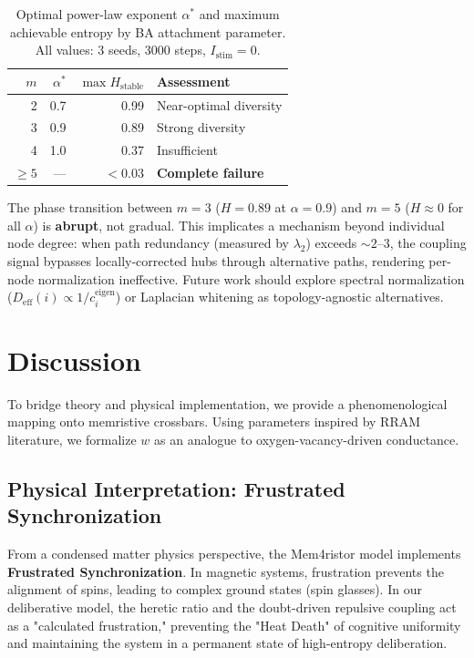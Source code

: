 \documentclass[11pt]{article}
\begin{document}
\begin{table}[h]
\centering
\caption{Optimal power-law exponent $\alpha^*$ and maximum achievable entropy by BA attachment parameter. All values: 3 seeds, 3000 steps, $I_{\text{stim}} = 0$.}
\label{tab:alpha_sweep}
\begin{tabular}{rrrl}
\toprule
$m$ & $\alpha^*$ & $\max H_{\text{stable}}$ & Assessment \\
\midrule
2  & 0.7 & 0.99 & Near-optimal diversity \\
3  & 0.9 & 0.89 & Strong diversity \\
4  & 1.0 & 0.37 & Insufficient \\
$\geq 5$ & --- & $<0.03$ & \textbf{Complete failure} \\
\bottomrule
\end{tabular}
\end{table}

The phase transition between $m=3$ ($H = 0.89$ at $\alpha = 0.9$) and $m = 5$ ($H \approx 0$ for all $\alpha$) is \textbf{abrupt}, not gradual. This implicates a mechanism beyond individual node degree: when path redundancy (measured by $\lambda_2$) exceeds $\sim 2$--$3$, the coupling signal bypasses locally-corrected hubs through alternative paths, rendering per-node normalization ineffective. Future work should explore spectral normalization ($D_{\text{eff}}(i) \propto 1/c_i^{\text{eigen}}$) or Laplacian whitening as topology-agnostic alternatives.

\section{Discussion}

To bridge theory and physical implementation, we provide a phenomenological mapping onto memristive crossbars. Using parameters inspired by RRAM literature, we formalize $w$ as an analogue to oxygen-vacancy-driven conductance. 

\subsection{Physical Interpretation: Frustrated Synchronization}
From a condensed matter physics perspective, the Mem4ristor model implements \textbf{Frustrated Synchronization}. In magnetic systems, frustration prevents the alignment of spins, leading to complex ground states (spin glasses). In our deliberative model, the heretic ratio and the doubt-driven repulsive coupling act as a "calculated frustration," preventing the "Heat Death" of cognitive uniformity and maintaining the system in a permanent state of high-entropy deliberation.
\end{document}
